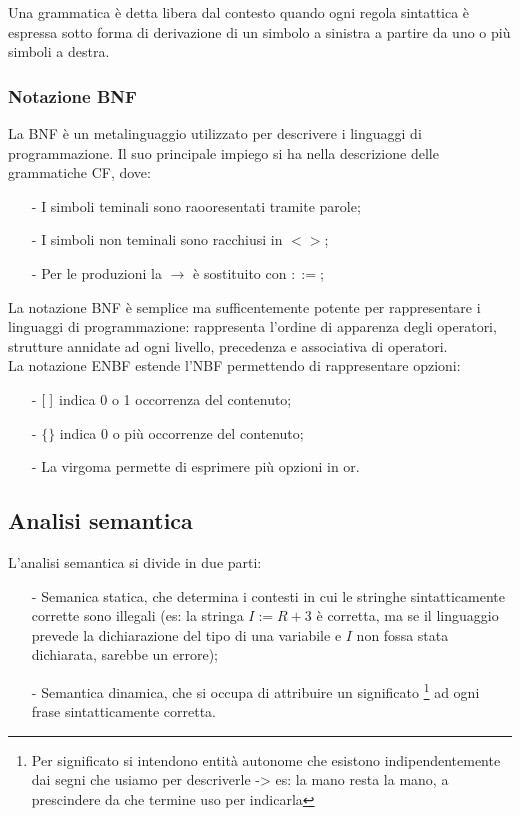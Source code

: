 \documentclass[a4paper, 10pt]{report}
\begin{document}
\noindent Una grammatica è detta libera dal contesto quando ogni regola sintattica è espressa sotto forma di derivazione di un simbolo a sinistra a partire da uno o più simboli a destra.

\subsubsection*{Notazione BNF}

La BNF è un metalinguaggio utilizzato per descrivere i linguaggi di programmazione. 
Il suo principale impiego si ha nella descrizione delle grammatiche CF, dove:
\begin{itemize}
\item[-] I simboli teminali sono raooresentati tramite parole;
\item[-] I simboli non teminali sono racchiusi in $<>$;
\item[-] Per le produzioni la $\rightarrow$ è sostituito con $::=$; 
\end{itemize}

\noindent La notazione BNF è semplice ma sufficentemente potente per rappresentare i linguaggi di programmazione: rappresenta   l’ordine   di apparenza   degli   operatori,   strutture   annidate   ad   ogni livello,   precedenza   e   associativa   di   operatori.  \\

\noindent La notazione ENBF estende l'NBF permettendo di rappresentare opzioni:
\begin{itemize}
\item[-] $[ \hspace{0.1cm}]$ indica 0 o 1 occorrenza del contenuto;
\item[-] $\{\}$ indica 0 o più occorrenze del contenuto;
\item[-] La virgoma permette di esprimere più opzioni in or.
\end{itemize}


\subsection*{Analisi semantica}
L'analisi semantica si divide in due parti:
\begin{itemize}
\item[-] Semanica statica, che determina i contesti in cui le stringhe sintatticamente corrette sono illegali (es: la stringa $I:=R+3$ è corretta, ma se il linguaggio prevede la dichiarazione del tipo di una variabile e $I$ non fossa stata dichiarata, sarebbe un errore);
\item[-] Semantica dinamica, che si occupa di attribuire un significato \footnote{Per significato si intendono entità autonome che esistono indipendentemente dai segni che usiamo per descriverle -> es: la mano resta la mano, a prescindere da che termine uso per indicarla} ad ogni frase sintatticamente corretta.
\end{itemize}
\end{document}
